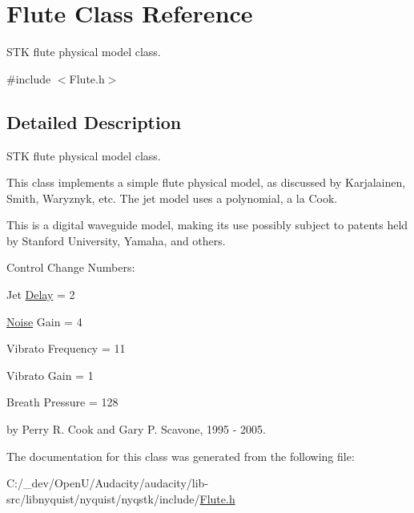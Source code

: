 \hypertarget{class_flute}{}\section{Flute Class Reference}
\label{class_flute}


S\+TK flute physical model class.  




{\ttfamily \#include $<$Flute.\+h$>$}



\subsection{Detailed Description}
S\+TK flute physical model class. 

This class implements a simple flute physical model, as discussed by Karjalainen, Smith, Waryznyk, etc. The jet model uses a polynomial, a la Cook.

This is a digital waveguide model, making its use possibly subject to patents held by Stanford University, Yamaha, and others.

Control Change Numbers\+:
\begin{DoxyItemize}
\item Jet \hyperlink{class_delay}{Delay} = 2
\item \hyperlink{class_noise}{Noise} Gain = 4
\item Vibrato Frequency = 11
\item Vibrato Gain = 1
\item Breath Pressure = 128
\end{DoxyItemize}

by Perry R. Cook and Gary P. Scavone, 1995 -\/ 2005. 

The documentation for this class was generated from the following file\+:\begin{DoxyCompactItemize}
\item 
C\+:/\+\_\+dev/\+Open\+U/\+Audacity/audacity/lib-\/src/libnyquist/nyquist/nyqstk/include/\hyperlink{_flute_8h}{Flute.\+h}\end{DoxyCompactItemize}
